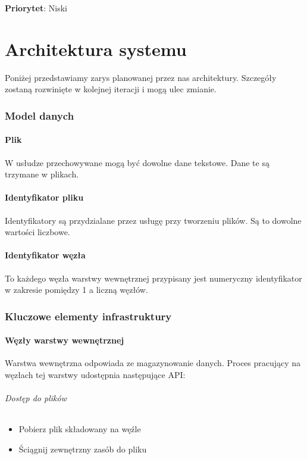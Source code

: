 \documentclass[a4paper,11pt]{article}
\begin{document}
\textbf{Priorytet}: Niski


\part{Architektura systemu}
Poniżej przedstawiamy zarys planowanej przez nas architektury.
Szczegóły zostaną rozwinięte w kolejnej iteracji i mogą ulec zmianie.

\section{Model danych}
\subsection{Plik}
W usłudze przechowywane mogą być dowolne dane tekstowe.  Dane te są
trzymane w plikach.

\subsection{Identyfikator pliku}
Identyfikatory są przydzialane przez usługę przy tworzeniu plików.
Są to dowolne wartości liczbowe.

\subsection{Identyfikator węzła}
To każdego węzła warstwy wewnętrznej przypisany jest numeryczny
identyfikator w zakresie pomiędzy 1 a liczną węzłów.

\section{Kluczowe elementy infrastruktury}
\subsection{Węzły warstwy wewnętrznej}
Warstwa wewnętrzna odpowiada ze magazynowanie danych.  Proces pracujący
na węzłach tej warstwy udostępnia następujące API:
\paragraph{Dostęp do plików}
\begin{itemize}
  \item Pobierz plik składowany na węźle
  \item Ściągnij zewnętrzny zasób do pliku
\end{itemize}
\end{document}
